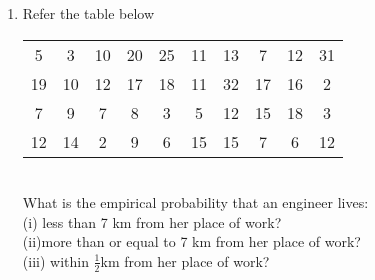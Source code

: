 \renewcommand{\theequation}{\theenumi}
\begin{enumerate}[label=\arabic*.,ref=\thesubsection.\theenumi]
\item Refer the table below\\

\begin{tabular}{ cccccccccc} 
	
	5 &3 &10 &20 &25 &11 &13 &7 &12 &31\\
	19 &10 &12 &17 &18 &11 &32 &17 &16 &2\\
	7 &9 &7 &8 &3 &5 &12 &15 &18 &3 \\
	12 &14 &2 &9 &6 &15 &15 &7 &6 &12\\ 
\end{tabular}\\

What is the empirical probability that an engineer lives:\\
(i) less than 7 km from her place of work?\\
(ii)more than or equal to 7 km from her place of work?\\
(iii) within $\frac{1}{2}$km from her place of work?\\

\end{enumerate}